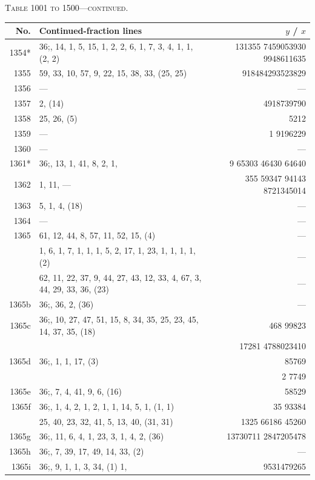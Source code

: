 \documentclass[11pt]{article}
\newcommand{\peheading}{%
  \begin{center}\small\textsc{Table 1001 to 1500---continued.}\end{center}
}
\begin{document}
\peheading
\renewcommand{\arraystretch}{1.15}
{\footnotesize
\begin{longtable}{|r|p{8.5cm}|r|}
\hline
\textbf{No.} & \textbf{Continued-fraction lines} & \textbf{$y$ \;/\; $x$}\\
\hline\endhead
1354*  & $36$;\; 58, 14, 1, 5, 15, 1, 2, 2, 6, 1, 7, 3, 4, 1, 1, (2, 2) & 131355 7459053930 9948611635 \\
1355   & 59, 33, 10, 57, 9, 22, 15, 38, 33, (25, 25) & 918484293523829 \\
1356   & --- & --- \\
1357   & 2, (14) & 4918739790 \\
1358   & 25, 26, (5) & 5212 \\
1359   & --- & 1 9196229 \\
1360   & --- & --- \\
\hline
1361*  & $36$;\; 60, 13, 1, 41, 8, 2, 1, & 9 65303 46430 64640 \\
1362   & 1, 11, --- & 355 59347 94143 8721345014 \\
1363   & 5, 1, 4, (18) & --- \\
1364   & --- & --- \\
1365   & 61, 12, 44, 8, 57, 11, 52, 15, (4) & --- \\
       & 1, 6, 1, 7, 1, 1, 1, 5, 2, 17, 1, 23, 1, 1, 1, 1, (2) & --- \\
       & 62, 11, 22, 37, 9, 44, 27, 43, 12, 33, 4, 67, 3, 44, 29, 33, 36, (23) & --- \\
\hline
1365b  & $36$;\; 1, 36, 2, (36) & --- \\
\hline
1365c  & $36$;\; 63, 10, 27, 47, 51, 15, 8, 34, 35, 25, 23, 45, 14, 37, 35, (18) & 468 99823 \\
       & & 17281 4788023410 \\
\hline
1365d  & $36$;\; 64, 1, 1, 17, (3) & 85769 \\
       & & 2 7749 \\
\hline
1365e  & $36$;\; 65, 7, 4, 41, 9, 6, (16) & 58529 \\
\hline
1365f  & $36$;\; 9, 1, 4, 2, 1, 2, 1, 1, 14, 5, 1, (1, 1) & 35 93384 \\
       & 25, 40, 23, 32, 41, 5, 13, 40, (31, 31) & 1325 66186 45260 \\
\hline
1365g  & $36$;\; 66, 11, 6, 4, 1, 23, 3, 1, 4, 2, (36) & 13730711 2847205478 \\
\hline
1365h  & $36$;\; 67, 7, 39, 17, 49, 14, 33, (2) & --- \\
\hline
1365i  & $36$;\; 1, 9, 1, 1, 3, 34, (1) 1, & 9531479265 \\

\end{longtable}}
\end{document}
